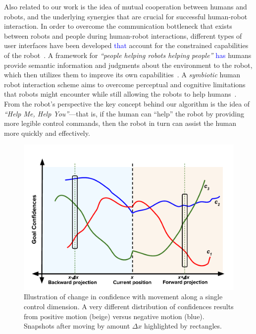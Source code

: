 \documentclass[conference]{IEEEtran}
\begin{document}
Also related to our work is the idea of mutual cooperation between humans and robots, and the underlying synergies that are crucial for successful human-robot interaction. In order to overcome the communication bottleneck that exists between robots and people during human-robot interactions, different types of user interfaces have been developed \textcolor{blue}{that} account for the constrained capabilities of the robot~\cite{goodfellow2010help}. A framework for \textit{``people helping robots helping people''} \textcolor{blue}{has} humans provide semantic information and judgments about the environment to the robot, which then utilizes them to improve its own capabilities~\cite{sorokin2010people}. A \textit{symbiotic} human robot interaction scheme aims to overcome perceptual and cognitive limitations that robots might encounter while still allowing the robots to help humans~\cite{rosenthal2010effective}. From the robot's perspective the key concept behind our algorithm is the idea of \textit{``Help Me, Help You''}---that is, if the human can ``help'' the robot by providing more legible control commands, then the robot in turn can assist the human more quickly and effectively.

\begin{figure}
	\includegraphics[width = 1\hsize, height = 0.26\vsize]{./figures/DisambMetric.pdf}
	\vspace{-0.4cm}
	\caption{Illustration of change in confidence with movement along a single control dimension. A very different distribution of confidences results from positive motion (beige) versus negative motion (blue). Snapshots after moving by amount $\Delta x$ highlighted by rectangles.}
	\label{DM_FIG}
\end{figure}
\end{document}
